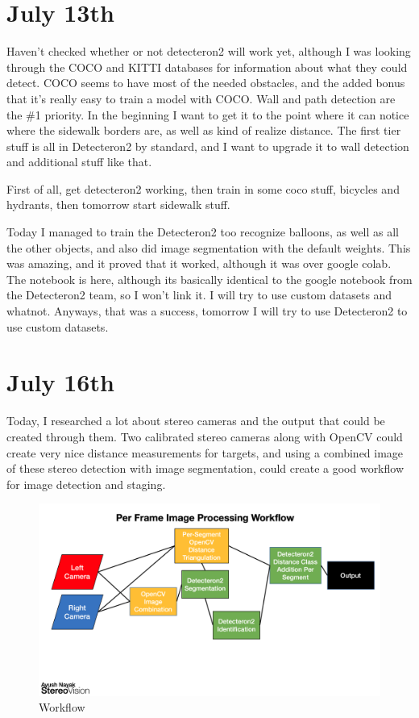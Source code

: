 \documentclass{article}
\begin{document}
\section{July 13th}


Haven't checked whether or not detecteron2 will work yet, although I was looking through the COCO and KITTI databases for information about what they could detect. COCO seems to have most of the needed obstacles, and the added bonus that it's really easy to train a model with COCO. Wall and path detection are the \#1 priority. In the beginning I want to get it to the point where it can notice where the sidewalk borders are, as well as kind of realize distance. The first tier stuff is all in Detecteron2 by standard, and I want to upgrade it to wall detection and additional stuff like that.

First of all, get detecteron2 working, then train in some coco stuff, bicycles and hydrants, then tomorrow start sidewalk stuff.

Today I managed to train the Detecteron2 too recognize balloons, as well as all the other objects, and also did image segmentation with the default weights. This was amazing, and it proved that it worked, although it was over google colab. The notebook is here, although its basically identical to the google notebook from the Detecteron2 team, so I won't link it. I will try to use custom datasets and whatnot. Anyways, that was a success, tomorrow I will try to use Detecteron2 to use custom datasets.


\section{July 16th}

Today, I researched a lot about stereo cameras and the output that could be created through them. Two calibrated stereo cameras along with OpenCV could create very nice distance measurements for targets, and using a combined image of these stereo detection with image segmentation, could create a good workflow for image detection and staging.

\begin{figure}[htbp]
    \centerline{\includegraphics[scale=0.1]{Images/WorkflowJul16.png}}
    \caption{Workflow}
    \label{fig6}
\end{figure}
\end{document}
